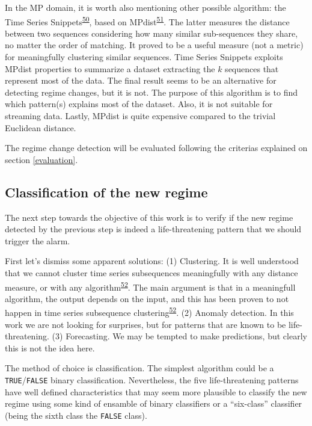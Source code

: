 \documentclass[12pt,twoside]{fmupthesis}
\begin{document}
In the MP domain, it is worth also mentioning other possible algorithm: the Time Series Snippets\textsuperscript{\protect\hyperlink{ref-Imani2018}{50}}, based on MPdist\textsuperscript{\protect\hyperlink{ref-gharghabi2018b}{51}}. The latter measures the distance between two
sequences considering how many similar sub-sequences they share, no matter the order of matching. It
proved to be a useful measure (not a metric) for meaningfully clustering similar sequences. Time
Series Snippets exploits MPdist properties to summarize a dataset extracting the \(k\) sequences that
represent most of the data. The final result seems to be an alternative for detecting regime
changes, but it is not. The purpose of this algorithm is to find which pattern(s) explains most of
the dataset. Also, it is not suitable for streaming data. Lastly, MPdist is quite expensive compared
to the trivial Euclidean distance.

The regime change detection will be evaluated following the criterias explained on section
\ref{evaluation}.

\hypertarget{classregime}{%
\subsection{Classification of the new regime}\label{classregime}}

The next step towards the objective of this work is to verify if the new regime detected by the
previous step is indeed a life-threatening pattern that we should trigger the alarm.

First let's dismiss some apparent solutions: (1) Clustering. It is well understood that we cannot
cluster time series subsequences meaningfully with any distance measure, or with any algorithm\textsuperscript{\protect\hyperlink{ref-Keogh2005}{52}}. The main argument is that in a meaningfull algorithm, the output depends on the input,
and this has been proven to not happen in time series subsequence clustering\textsuperscript{\protect\hyperlink{ref-Keogh2005}{52}}. (2)
Anomaly detection. In this work we are not looking for surprises, but for patterns that are known to
be life-threatening. (3) Forecasting. We may be tempted to make predictions, but clearly this is not
the idea here.

The method of choice is classification. The simplest algorithm could be a \texttt{TRUE}/\texttt{FALSE} binary
classification. Nevertheless, the five life-threatening patterns have well defined characteristics
that may seem more plausible to classify the new regime using some kind of ensamble of binary
classifiers or a ``six-class'' classifier (being the sixth class the \texttt{FALSE} class).
\end{document}
